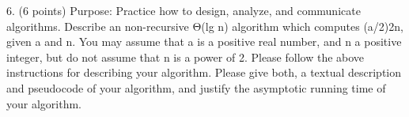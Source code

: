 6. (6 points) Purpose: Practice how to design, analyze, and communicate algorithms. Describe an non-recursive Θ(lg n) algorithm which computes (a/2)2n, given a and n. You may assume that a is a positive real number, and n a positive integer, but do not assume that n is a power of 2. Please follow the above instructions for describing your algorithm. Please give both, a textual description and pseudocode of your algorithm, and justify the asymptotic running time of your algorithm.

